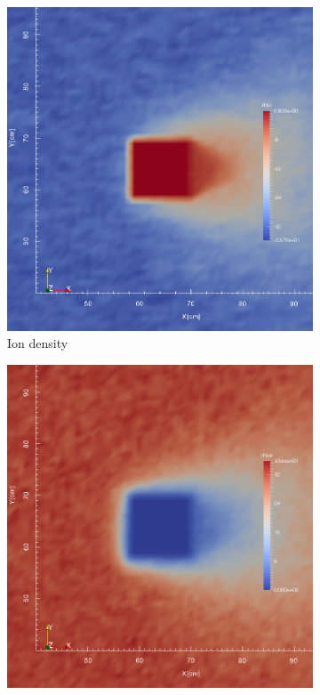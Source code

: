 \documentclass[twoside]{article}
\begin{document}
\begin{figure}[H]
\centering
\begin{subfigure}{.5\textwidth}
  \centering
  \includegraphics[width=\linewidth]{rhoi_1sim_kobe_M2_B50.png}
  \caption{Ion density}
  \label{fig:sub21}
\end{subfigure}%
\begin{subfigure}{.5\textwidth}
  \centering
  \includegraphics[width=\linewidth]{rhoe_1sim_kobe_M2_B50.png}

\end{subfigure}
\end{figure}
\end{document}
